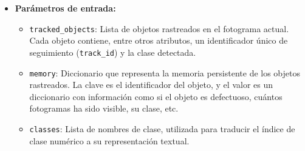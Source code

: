 \documentclass[11pt,spanish,listoffigures,listoftables]{tfgetsinf}
\begin{document}
\begin{itemize}
   \item \textbf{Parámetros de entrada:}
   \begin{itemize}
      \item \texttt{tracked\_objects}: Lista de objetos rastreados en el fotograma actual. Cada objeto contiene, entre otros atributos, un identificador único de seguimiento (\texttt{track\_id}) y la clase detectada.
      \item \texttt{memory}: Diccionario que representa la memoria persistente de los objetos rastreados. La clave es el identificador del objeto, y el valor es un diccionario con información como si el objeto es defectuoso, cuántos fotogramas ha sido visible, su clase, etc.
      \item \texttt{classes}: Lista de nombres de clase, utilizada para traducir el índice de clase numérico a su representación textual.
   \end{itemize}


\end{itemize}
\end{document}
